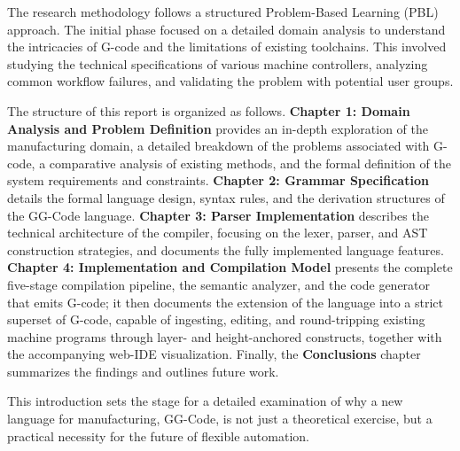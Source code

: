The research methodology follows a structured Problem-Based Learning (PBL) approach. The initial phase focused on a detailed domain analysis to understand the intricacies of G-code and the limitations of existing toolchains. This involved studying the technical specifications of various machine controllers, analyzing common workflow failures, and validating the problem with potential user groups.

The structure of this report is organized as follows. \textbf{Chapter 1: Domain Analysis and Problem Definition} provides an in-depth exploration of the manufacturing domain, a detailed breakdown of the problems associated with G-code, a comparative analysis of existing methods, and the formal definition of the system requirements and constraints. \textbf{Chapter 2: Grammar Specification} details the formal language design, syntax rules, and the derivation structures of the GG-Code language. \textbf{Chapter 3: Parser Implementation} describes the technical architecture of the compiler, focusing on the lexer, parser, and AST construction strategies, and documents the fully implemented language features. \textbf{Chapter 4: Implementation and Compilation Model} presents the complete five-stage compilation pipeline, the semantic analyzer, and the code generator that emits G-code; it then documents the extension of the language into a strict superset of G-code, capable of ingesting, editing, and round-tripping existing machine programs through layer- and height-anchored constructs, together with the accompanying web-IDE visualization. Finally, the \textbf{Conclusions} chapter summarizes the findings and outlines future work.

This introduction sets the stage for a detailed examination of why a new language for manufacturing, GG-Code, is not just a theoretical exercise, but a practical necessity for the future of flexible automation.
